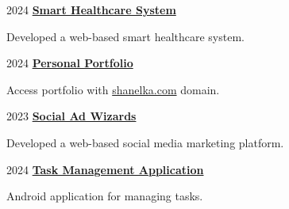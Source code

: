 
\begin{twocolentry}{
      2024
   }
   \textbf{\href{https://github.com/ShanelkaPramuditha/smart-healthcare-system}{\textcolor{secondaryColor}{Smart Healthcare System}}}
   \begin{highlights}
      \item Developed a web-based smart healthcare system.
   \end{highlights}
\end{twocolentry}

\vspace{0.3 cm}

\begin{twocolentry}{
      2024
   }
   \textbf{\href{https://github.com/ShanelkaPramuditha/portfolio}{\textcolor{secondaryColor}{Personal Portfolio}}}
   \begin{highlights}
      \item Access portfolio with \href{https://shanelka.com}{shanelka.com} domain.
   \end{highlights}
\end{twocolentry}

\vspace{0.3 cm}

\begin{twocolentry}{
      2023
   }
   \textbf{\href{https://github.com/ShanelkaPramuditha/IWT-Project-Social-Ad-Wizards}{\textcolor{secondaryColor}{Social Ad Wizards}}}
   \begin{highlights}
      \item Developed a web-based social media marketing platform.
   \end{highlights}
\end{twocolentry}

\vspace{0.3 cm}

\begin{twocolentry}{
      2024
   }
   \textbf{\href{https://github.com/ShanelkaPramuditha/task-management-app}{\textcolor{secondaryColor}{Task Management Application}}}
   \begin{highlights}
      \item Android application for managing tasks.
   \end{highlights}
\end{twocolentry}

